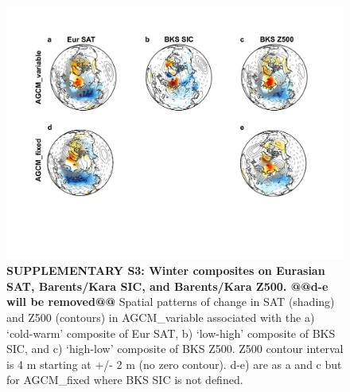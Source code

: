 \documentclass{nature}
\begin{document}
\begin{figure}%
\centering
\noindent\includegraphics[width=39pc]{Word/SuppFig_xx.pdf}
\caption{\textbf{SUPPLEMENTARY S3: Winter composites on Eurasian SAT, Barents/Kara SIC, and Barents/Kara Z500. @@d-e will be removed@@}  Spatial patterns of change in SAT (shading) and Z500 (contours) in AGCM\_variable associated with the a) `cold-warm' composite of Eur SAT, b) `low-high' composite of BKS SIC, and c) `high-low' composite of BKS Z500. Z500 contour interval is 4 m starting at +/- 2 m (no zero contour). d-e) are as a and c but for AGCM\_fixed where BKS SIC is not defined. %
} 
\label{fig:supp3} 
\end{figure}

\end{document}
